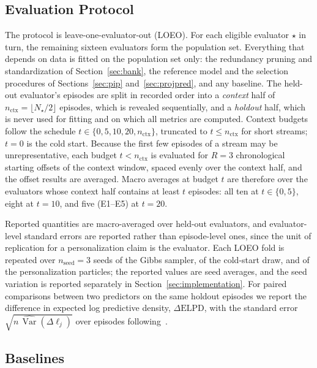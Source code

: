 \documentclass[lettersize,journal]{IEEEtran}
\newcommand{\Var}{\operatorname{Var}}
\newcommand{\newuser}{\star}
\begin{document}
\subsection{Evaluation Protocol}
\label{sec:protocol}

The protocol is leave-one-evaluator-out (LOEO). For each eligible evaluator $\newuser$ in turn, the remaining sixteen evaluators form the population set. Everything that depends on data is fitted on the population set only: the redundancy pruning and standardization of Section~\ref{sec:bank}, the reference model and the selection procedures of Sections~\ref{sec:pip} and~\ref{sec:projpred}, and any baseline. The held-out evaluator's episodes are split in recorded order into a \emph{context} half of $n_{\mathrm{ctx}}=\lfloor N_{\newuser}/2\rfloor$ episodes, which is revealed sequentially, and a \emph{holdout} half, which is never used for fitting and on which all metrics are computed. Context budgets follow the schedule $t\in\{0,5,10,20,n_{\mathrm{ctx}}\}$, truncated to $t\le n_{\mathrm{ctx}}$ for short streams; $t=0$ is the cold start. Because the first few episodes of a stream may be unrepresentative, each budget $t<n_{\mathrm{ctx}}$ is evaluated for $R=3$ chronological starting offsets of the context window, spaced evenly over the context half, and the offset results are averaged. Macro averages at budget $t$ are therefore over the evaluators whose context half contains at least $t$ episodes: all ten at $t\in\{0,5\}$, eight at $t=10$, and five (E1--E5) at $t=20$.

Reported quantities are macro-averaged over held-out evaluators, and evaluator-level standard errors are reported rather than episode-level ones, since the unit of replication for a personalization claim is the evaluator. Each LOEO fold is repeated over $n_{\mathrm{seed}}=3$ seeds of the Gibbs sampler, of the cold-start draw, and of the personalization particles; the reported values are seed averages, and the seed variation is reported separately in Section~\ref{sec:implementation}. For paired comparisons between two predictors on the same holdout episodes we report the difference in expected log predictive density, $\Delta\mathrm{ELPD}$, with the standard error $\sqrt{n\,\widehat{\Var}(\Delta\ell_j)}$ over episodes following~\cite{vehtari2017loo}.

\subsection{Baselines}
\label{sec:baselines}
\end{document}
